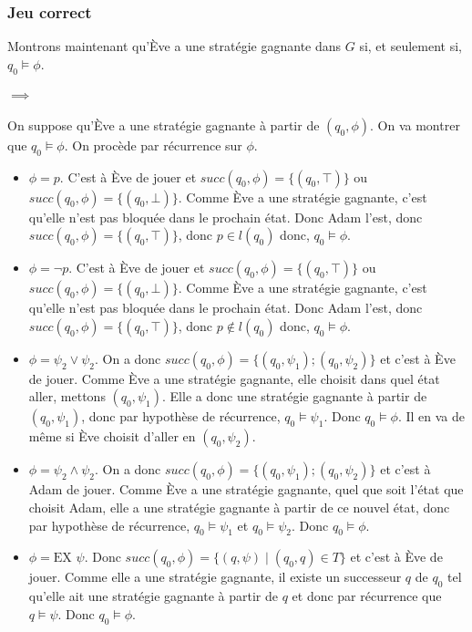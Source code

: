 \documentclass[10pt,a4paper]{article}
\begin{document}
\subsubsection{Jeu correct}
Montrons maintenant qu'Ève a une stratégie gagnante dans $G$ si, et seulement si, $q_0 \vDash \phi$.

\paragraph{$\implies$}
On suppose qu'Ève a une stratégie gagnante à partir de $(q_0, \phi)$. On va montrer que $q_0 \vDash \phi$. On procède par récurrence sur $\phi$.

\begin{itemize}
\item $\phi = p$. C'est à Ève de jouer et $succ(q_0,\phi) = \{(q_0, \top)\}$ ou $succ(q_0,\phi) = \{(q_0, \bot)\}$. Comme Ève a une stratégie gagnante, c'est qu'elle n'est pas bloquée dans le prochain état. Donc Adam l'est, donc $succ(q_0,\phi) = \{(q_0, \top)\}$, donc $p \in l(q_0)$ donc, $q_0 \vDash \phi$.

\item $\phi = \neg p$. C'est à Ève de jouer et $succ(q_0,\phi) = \{(q_0, \top)\}$ ou $succ(q_0,\phi) = \{(q_0, \bot)\}$. Comme Ève a une stratégie gagnante, c'est qu'elle n'est pas bloquée dans le prochain état. Donc Adam l'est, donc $succ(q_0,\phi) = \{(q_0, \top)\}$, donc $p \notin l(q_0)$ donc, $q_0 \vDash \phi$.

\item $\phi = \psi_2 \lor \psi_2$. On a donc $succ(q_0,\phi) = \{(q_0, \psi_1); (q_0, \psi_2) \}$ et c'est à Ève de jouer. Comme Ève a une stratégie gagnante, elle choisit dans quel état aller, mettons $(q_0, \psi_1)$. Elle a donc une stratégie gagnante à partir de $(q_0, \psi_1)$, donc par hypothèse de récurrence, $q_0 \vDash \psi_1$. Donc $q_0 \vDash \phi$. Il en va de même si Ève choisit d'aller en $(q_0, \psi_2)$.

\item $\phi = \psi_2 \land \psi_2$. On a donc $succ(q_0,\phi) = \{(q_0, \psi_1); (q_0, \psi_2) \}$ et c'est à Adam de jouer. Comme Ève a une stratégie gagnante, quel que soit l'état que choisit Adam, elle a une stratégie gagnante à partir de ce nouvel état, donc par hypothèse de récurrence, $q_0 \vDash \psi_1$ et $q_0 \vDash \psi_2$. Donc $q_0 \vDash \phi$.

\item $\phi = \mbox{EX } \psi$. Donc $succ(q_0, \phi) = \{ (q, \psi) \mid (q_0,q) \in T \} $ et c'est à Ève de jouer. Comme elle a une stratégie gagnante, il existe un successeur $q$ de $q_0$ tel qu'elle ait une stratégie gagnante à partir de $q$ et donc par récurrence que $q \vDash \psi$. Donc $q_0 \vDash \phi$.


\end{itemize}
\end{document}
